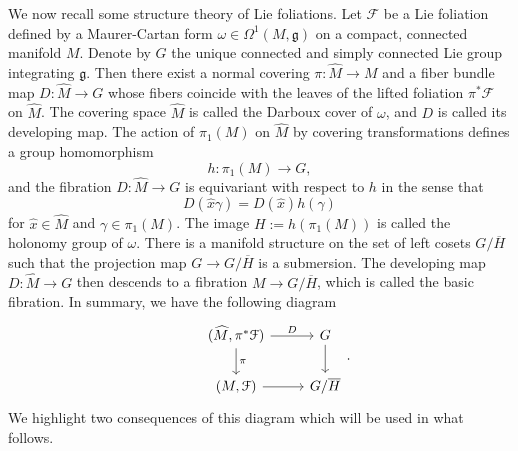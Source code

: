 \documentclass[11pt, letterpaper, oneside,reqno]{amsart}
\theoremstyle{plain}
\theoremstyle{underline}
\theoremstyle{definition}
\theoremstyle{remark}
\begin{document}
	We now recall some structure theory of Lie foliations. Let $\mathcal{F}$ be a Lie foliation defined by a Maurer-Cartan form $\omega\in\Omega^{1}(M,\mathfrak{g})$ on a compact, connected manifold $M$. Denote by $G$ the unique connected and simply connected Lie group integrating $\mathfrak{g}$. Then there exist a normal covering $\pi:\widehat{M}\rightarrow M$ and a fiber bundle map $D:\widehat{M}\rightarrow G$ whose fibers coincide with the leaves of the lifted foliation $\pi^{*}\mathcal{F}$ on $\widehat{M}$. The covering space $\widehat{M}$ is called the Darboux cover of $\omega$, and $D$ is called its developing map.
	The action of $\pi_1(M)$ on $\widehat{M}$ by covering transformations defines a group homomorphism
	\begin{equation*}\label{eq:hol}
		h:\pi_1(M)\rightarrow G,
	\end{equation*}
	and the fibration $D:\widehat{M}\rightarrow G$ is equivariant with respect to $h$ in the sense that
	\[
	D(\widehat{x}\gamma)=D(\widehat{x})h(\gamma)
	\]
	for $\widehat{x}\in\widehat{M}$ and $\gamma\in\pi_1(M)$. The image $H:=h(\pi_1(M))$ is called the holonomy group of $\omega$. 
	There is a manifold structure on the set of left cosets $G/\overline{H}$ such that the projection map $G\rightarrow G/\overline{H}$ is a submersion. The developing map $D:\widehat{M}\rightarrow G$ then descends to a fibration $M\rightarrow G/\overline{H}$, which is called the basic fibration. In summary, we have the following diagram
	\begin{equation}\label{eq:diagram}
	\begin{tikzcd}
		&(\widehat{M},\pi^{*}\mathcal{F})\arrow[r,"D"]\arrow[d,"\pi"]	&G\arrow[d]\\
		&(M,\mathcal{F})\arrow[r]& G/\overline{H}
	\end{tikzcd}.
	\end{equation}
	We highlight two consequences of this diagram which will be used in what follows.
\end{document}
